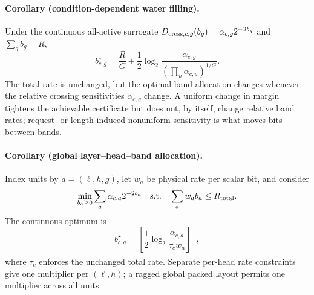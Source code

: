 \paragraph{Corollary (condition-dependent water filling).}
Under the continuous all-active surrogate
$D_{{\rm cross},c,g}(b_g)=\alpha_{c,g}2^{-2b_g}$ and
$\sum_gb_g=R$,
\begin{equation}
 b_{c,g}^\star=
 \frac RG+
 \frac12\log_2
 \frac{\alpha_{c,g}}
 {(\prod_u\alpha_{c,u})^{1/G}} .
 \label{eq:conditional-waterfilling}
\end{equation}
The total rate is unchanged, but the optimal band allocation changes
whenever the relative crossing sensitivities $\alpha_{c,g}$ change.  A
uniform change in margin tightens the achievable certificate but does not,
by itself, change relative band rates; request- or length-induced
nonuniform sensitivity is what moves bits between bands.

\paragraph{Corollary (global layer--head--band allocation).}
Index units by $a=(\ell,h,g)$, let $w_a$ be physical rate per scalar bit,
and consider
\begin{equation}
 \min_{b_a\geq0}\sum_a\alpha_{c,a}2^{-2b_a}
 \quad\text{s.t.}\quad
 \sum_aw_ab_a\leq R_{\rm total}.
\end{equation}
The continuous optimum is
\begin{equation}
 b_{c,a}^{\star}
 =
 \left[
 \frac12\log_2\frac{\alpha_{c,a}}{\tau_cw_a}
 \right]_+ ,
 \label{eq:global-conditional-waterfilling}
\end{equation}
where $\tau_c$ enforces the unchanged total rate.  Separate per-head rate
constraints give one multiplier per $(\ell,h)$; a ragged global packed
layout permits one multiplier across all units.

